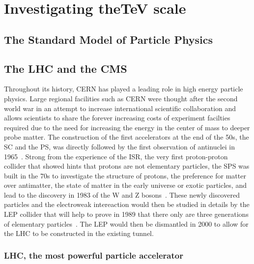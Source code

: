 \renewcommand\evenpagerightmark{{\scshape\small Chapter 2}}
\renewcommand\oddpageleftmark{{\scshape\small Investigating the\si{TeV} scale}}

\renewcommand{\bibname}{References}

\hyphenation{}

\chapter[Investigating the\si{TeV} scale]%
{Investigating the\si{TeV} scale}
\label{chapt:2}

\section{The Standard Model of Particle Physics}
\label{chapt2:sec:SM}

\section{The \acl{LHC} and the \acl{CMS}}
\label{chapt2:sec:LHC-CMS}

	Throughout its history, CERN has played a leading role in high energy particle physics. Large regional facilities such as CERN were thought after the second world war in an attempt to increase international scientific collaboration and allows scientists to share the forever increasing costs of experiment facilties required due to the need for increasing the energy in the center of mass to deeper probe matter. The construction of the first accelerators at the end of the 50s, the \acf{SC} and the \acf{PS}, was directly followed by the first observation of antinuclei in 1965~\cite{MASSAM1965}. Strong from the experience of the \acf{ISR}, the very first proton-proton collider that showed hints that protons are not elementary particles, the \acf{SPS} was built in the 70s to investigate the structure of protons, the preference for matter over antimatter, the state of matter in the early universe or exotic particles, and lead to the discovery in 1983 of the W and Z bosons~\cite{UA1W1983,UA2W1983,UA1Z1983,UA2Z1983}. These newly discovered particles and the electroweak intereaction would then be studied in details by the \acf{LEP} collider that will help to prove in 1989 that there only are three generations of elementary particles~\cite{ALEPH1989}. The LEP would then be dismantled in 2000 to allow for the LHC to be constructed in the existing tunnel.

	\subsection{LHC, the most powerful particle accelerator}
	\label{chapt2:ssec:LHC}
	
